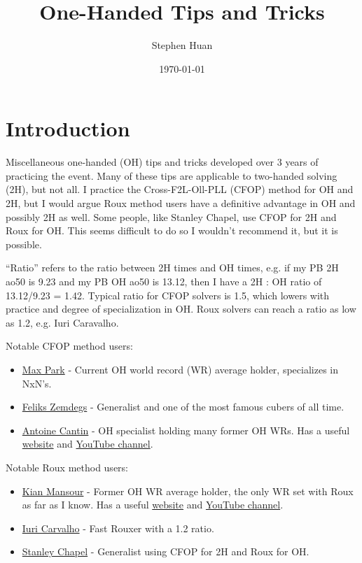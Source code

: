 \documentclass[11pt, oneside]{article}
\title{One-Handed Tips and Tricks}
\author{Stephen Huan}
\date{\today}
\begin{document}
\maketitle

\section{Introduction}

Miscellaneous one-handed (OH) tips and tricks developed over
3 years of practicing the event. Many of these tips are applicable to
two-handed solving (2H), but not all.
I practice the Cross-F2L-Oll-PLL (CFOP) method for OH and 2H,
but I would argue Roux method users have a definitive advantage in OH and
possibly 2H as well.
Some people, like Stanley Chapel, use CFOP for 2H and Roux for OH.
This seems difficult to do so I wouldn't recommend it, but it is possible.

\enquote{Ratio} refers to the ratio between 2H times and OH times, e.g.
if my PB 2H ao50 is 9.23 and my PB OH ao50 is 13.12, then I have a 2H : OH ratio
of 13.12/9.23 = 1.42. Typical ratio for CFOP solvers is 1.5, which lowers with
practice and degree of specialization in OH.
Roux solvers can reach a ratio as low as 1.2, e.g. Iuri Caravalho.

Notable CFOP method users:
\begin{itemize} 
  \item \href{https://www.worldcubeassociation.org/persons/2012PARK03}{Max Park}
    - Current OH world record (WR) average holder, specializes in NxN's. 
  \item \href{https://www.worldcubeassociation.org/persons/2009ZEMD01}{Feliks Zemdegs}
    - Generalist and one of the most famous cubers of all time.
  \item \href{https://www.worldcubeassociation.org/persons/2010CANT02}{Antoine Cantin}
    - OH specialist holding many former OH WRs. Has a useful
    \href{https://sites.google.com/site/antoineccantin/Home}{website}
    and \href{https://www.youtube.com/user/antoineccantin}{YouTube channel}.
\end{itemize}

Notable Roux method users:
\begin{itemize} 
  \item \href{https://www.worldcubeassociation.org/persons/2015MANS03}{Kian Mansour}
    - Former OH WR average holder, the only WR set with Roux as far as I know.
    Has a useful \href{https://sites.google.com/view/kianroux}{website} and
    \href{https://www.youtube.com/c/PenguinsDontFly/videos}{YouTube channel}.
  \item \href{https://www.worldcubeassociation.org/persons/2015CARV06}{Iuri Carvalho}
    - Fast Rouxer with a 1.2 ratio. 
  \item \href{https://www.worldcubeassociation.org/persons/2016CHAP04}{Stanley Chapel}
    - Generalist using CFOP for 2H and Roux for OH. 
\end{itemize}
\end{document}
